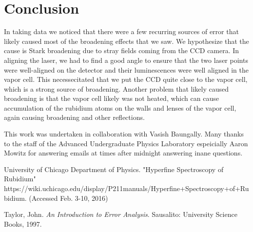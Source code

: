 \documentclass{article}
\begin{document}
\section{Conclusion}
  In taking data we noticed that there were a few recurring sources of error that likely caused most of the broadening effects that we saw.  We hypothesize that the cause is Stark broadening due to stray fields coming from the CCD camera.  In aligning the laser, we had to find a good angle to ensure that the two laser points were well-aligned on the detector and their luminescences were well aligned in the vapor cell.  This necessecitated that we put the CCD quite close to the vapor cell, which is a strong source of broadening.  Another problem that likely caused broadening is that the vapor cell likely was not heated, which can cause accumulation of the rubidium atoms on the walls and lenses of the vapor cell, again causing broadening and other reflections.

  \hspace{.25cm}

  This work was undertaken in collaboration with Vasish Baungally.  Many thanks to the staff of the Advanced Undergraduate Physics Laboratory espeicially Aaron Mowitz for answering emails at times after midnight answering inane questions.

  \begin{thebibliography}{10}
    	University of Chicago Department of Physics. "Hyperfine Spectroscopy of Rubidium"\\
    	https://wiki.uchicago.edu/display/P211manuals/Hyperfine+Spectroscopy+of+Rubidium. (Accessed Feb. 3-10, 2016)

    	Taylor, John. \emph{An Introduction to Error Analysis}. Sausalito: University Science Books, 1997.
  \end{thebibliography}
\end{document}
